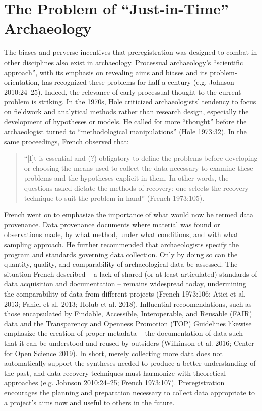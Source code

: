 \documentclass[article]{sa}
\begin{document}
\section{The Problem of ``Just-in-Time''
Archaeology}

The biases and perverse incentives that preregistration was designed to
combat in other disciplines also exist in archaeology. Processual
archaeology's ``scientific approach'', with its emphasis on revealing aims
and biases and its problem-orientation, has recognized these problems
for half a century (e.g. Johnson 2010:24--25). Indeed, the relevance of
early processual thought to the current problem is striking. In the
1970s, Hole criticized archaeologists' tendency to focus on fieldwork
and analytical methods rather than research design, especially the
development of hypotheses or models. He called for more ``thought'' before
the archaeologist turned to ``methodological manipulations'' (Hole
1973:32). In the same proceedings, French observed that:

\begin{quote}
    
``{[}I{]}t is essential and (?) obligatory to define the problems before
developing or choosing the means used to collect the data necessary to
examine these problems and the hypotheses explicit in them. In other
words, the questions asked dictate the methods of recovery; one selects
the recovery technique to suit the problem in hand'' (French 1973:105).

\end{quote}

French went on to emphasize the importance of what would now be termed
data provenance. Data provenance documents where material was found or
observations made, by what method, under what conditions, and with what
sampling approach. He further recommended that archaeologists specify
the program and standards governing data collection. Only by doing so
can the quantity, quality, and comparability of archaeological data be
assessed. The situation French described -- a lack of shared (or at
least articulated) standards of data acquisition and documentation --
remains widespread today, undermining the comparability of data from
different projects (French 1973:106; Atici et al. 2013; Faniel et al.
2013; Holub et al. 2018). Influential recoomendations, such as those
encapsulated by Findable, Accessible, Interoperable, and Reusable (FAIR)
data and the Transparency and Openness Promotion (TOP) Guidelines
likewise emphasize the creation of proper metadata -- the
documentation of data such that it can be understood and reused by
outsiders (Wilkinson et al. 2016; Center for Open Science 2019). In
short, merely collecting more data does not automatically support the
syntheses needed to produce a better understanding of the past, and
data-recovery techniques must harmonize with theoretical approaches
(e.g. Johnson 2010:24--25; French 1973:107). Preregistration encourages
the planning and preparation necessary to collect data appropriate to a
project's aims now and useful to others in the future.
\end{document}
